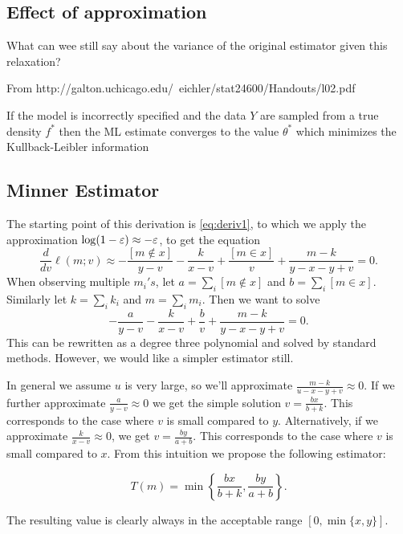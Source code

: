 


\subsection{Effect of approximation}

What can wee still say about the variance of the original estimator given this relaxation?

From http://galton.uchicago.edu/~eichler/stat24600/Handouts/l02.pdf

If the model is incorrectly specified and the data $Y$ are sampled from a true
density $f^*$ then the ML estimate converges to the value $\theta^*$ which minimizes
the Kullback-Leibler information


\subsection{Minner Estimator}

The starting point of this derivation is \cref{eq:deriv1},
to which we apply the approximation $\log(1-\varepsilon) \approx -\varepsilon$,
to get the equation
\[
   \frac{d}{dv}\ell(m;v) \approx
   -\frac{[m\not\in x]}{y-v} 
   -\frac{k}{x-v} 
   +\frac{[m\in x]}{v} 
   +\frac{m-k}{y-x-y+v} 
   = 0.
\]
When observing multiple $m_i's$, let $a=\sum_i [m\not\in x]$ and $b=\sum_i [m\in x]$.
Similarly let $k=\sum_i k_i$ and $m=\sum_i m_i$.
Then we want to solve
\[
   -\frac{a}{y-v} 
   -\frac{k}{x-v} 
   +\frac{b}{v} 
   +\frac{m-k}{y-x-y+v} 
   = 0.
\]
This can be rewritten as a degree three polynomial and solved by standard methods.
However, we would like a simpler estimator still.

In general we assume $u$ is very large, so we'll approximate $\frac{m-k}{u-x-y+v}\approx 0$.
If we further approximate $\frac{a}{y-v}\approx 0$ we get the simple solution $v=\frac{bx}{b+k}$.
This corresponds to the case where $v$ is small compared to $y$.
Alternatively, if we approximate $\frac{k}{x-v}\approx 0$, we get $v=\frac{b y}{a+b}$.
This corresponds to the case where $v$ is small compared to $x$.
From this intuition we propose the following estimator:
\begin{definition}
\[
   T(m) = \min\left\{\frac{bx}{b+k}, \frac{b y}{a+b}\right\}.
   \label{eq:minner}
\]
\end{definition}
The resulting value is clearly always in the acceptable range $[0,\min\{x,y\}]$.

